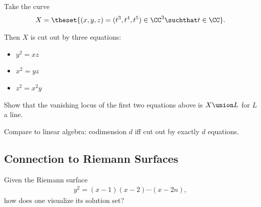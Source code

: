 \begin{example}

Take the curve
\begin{align*}  
X = \theset{(x, y, z) = (t^3, t^4, t^5) \in \CC^3 \suchthat t\in \CC}
.\end{align*}

Then \(X\) is cut out by three equations:

\begin{itemize}
\tightlist
\item
  \(y^2 = xz\)
\item
  \(x^2 = yz\)
\item
  \(z^2 = x^2 y\)
\end{itemize}

\end{example}

\begin{exercise}

Show that the vanishing locus of the first two equations above is
\(X\union L\) for \(L\) a line.

\end{exercise}

Compare to linear algebra: codimension \(d\) iff cut out by exactly
\(d\) equations.

\hypertarget{connection-to-riemann-surfaces}{%
\subsection{Connection to Riemann
Surfaces}\label{connection-to-riemann-surfaces}}

\begin{example}

Given the Riemann surface
\begin{align*}  
y^2 = (x-1)(x-2)\cdots(x-2n)
,\end{align*} how does one visualize its solution set?

\end{example}

